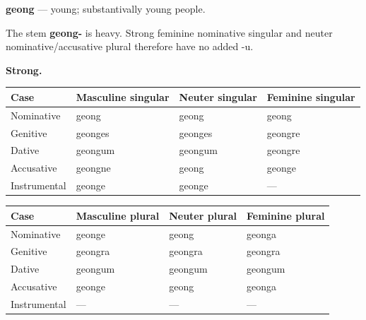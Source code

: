 \par\begin{minipage}{\linewidth}\raggedright
\textbf{geong} — young; substantivally young people.

The stem \textbf{geong-} is heavy. Strong feminine nominative singular and neuter nominative/\allowbreak{}accusative plural therefore have no added -u.

\textbf{Strong.}

\par\begingroup
\fontsize{10.5}{13.2}\selectfont
\setlength{\LTleft}{0pt}\setlength{\LTright}{\fill}
\noindent
\begin{tabular}{@{}>{\raggedright\arraybackslash}p{22.0mm}>{\raggedright\arraybackslash}p{31.188mm}>{\raggedright\arraybackslash}p{31.188mm}>{\raggedright\arraybackslash}p{31.188mm}@{}}
\toprule
\textbf{Case} & \textbf{Masculine singular} & \textbf{Neuter singular} & \textbf{Feminine singular} \\
\midrule
Nominative & geong & geong & geong \\
Genitive & geonges & geonges & geongre \\
Dative & geongum & geongum & geongre \\
Accusative & geongne & geong & geonge \\
Instrumental & geonge & geonge & — \\
\bottomrule
\end{tabular}
\par\endgroup
\end{minipage}\par
\par\addvspace{5pt}
\par\begingroup
\fontsize{10.5}{13.2}\selectfont
\setlength{\LTleft}{0pt}\setlength{\LTright}{\fill}
\noindent
\begin{tabular}{@{}>{\raggedright\arraybackslash}p{22.0mm}>{\raggedright\arraybackslash}p{31.188mm}>{\raggedright\arraybackslash}p{31.188mm}>{\raggedright\arraybackslash}p{31.188mm}@{}}
\toprule
\textbf{Case} & \textbf{Masculine plural} & \textbf{Neuter plural} & \textbf{Feminine plural} \\
\midrule
Nominative & geonge & geong & geonga \\
Genitive & geongra & geongra & geongra \\
Dative & geongum & geongum & geongum \\
Accusative & geonge & geong & geonga \\
Instrumental & — & — & — \\
\bottomrule
\end{tabular}
\par\endgroup

